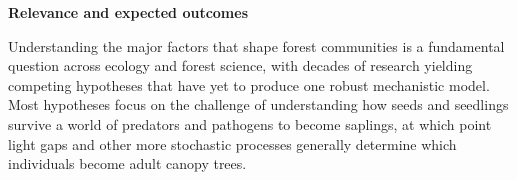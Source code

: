 \documentclass[11pt]{article}
\begin{document}



{\bf Relevance and expected outcomes} %

Understanding the major factors that shape forest communities is a fundamental question across ecology and forest science, with decades of research yielding competing hypotheses that have yet to produce one robust mechanistic model. Most hypotheses focus on the challenge of understanding how seeds and seedlings survive a world of predators and pathogens to become saplings, at which point light gaps and other more stochastic processes generally determine which individuals become adult canopy trees. 
\end{document}
